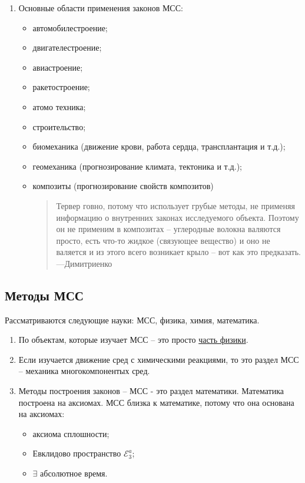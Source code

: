 \begin{itemize}
\begin{enumerate}
      \item Основные области применения законов МСС:
        \begin{itemize}
          \item автомобилестроение;
          \item двигателестроение;
          \item авиастроение;
          \item ракетостроение;
          \item атомо техника;
          \item строительство;
          \item биомеханика (движение крови, работа сердца, трансплантация и т.д.);
          \item геомеханика (прогнозирование климата, тектоника и т.д.);
          \item композиты (прогнозирование свойств композитов)
		  \newline
		  \begin{quotation}
				Тервер говно, потому что использует грубые методы, не применяя информацию о внутренних
				законах исследуемого объекта. Поэтому он не применим в композитах -- углеродные волокна 
				валяются просто, есть что-то жидкое (связующее вещество) и оно не валяется и из этого 
				всего возникает крыло -- вот как это предказать.
				\flushright---Димитриенко
			\end{quotation}
        \end{itemize}
    \end{enumerate}
\end{itemize}

\subsection{Методы МСС}

Рассматриваются следующие науки: МСС, физика, химия, математика.

\begin{enumerate}
  \item По объектам, которые изучает МСС -- это просто \underline{часть физики}.

  \item Если изучается движение сред с химическими реакциями, то это раздел МСС -- механика
    многокомпонентых сред.

  \item Методы построения законов -- МСС - это раздел математики. Математика построена на аксиомах.
    МСС близка к математике, потому что она основана на аксиомах:
    \begin{itemize}
      \item аксиома сплошности;
      \item Евклидово пространство $\mathcal{E}_3^a$;
      \item $\exists$ абсолютное время.
    \end{itemize}
\end{enumerate}


